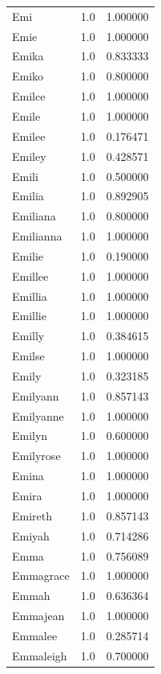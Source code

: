 \documentclass[
  letterpaper,
  DIV=11,
  numbers=noendperiod]{scrreprt}
\begin{document}
\begin{tabular}{lrr}
Emi             &   1.0 &   1.000000 \\
Emie            &   1.0 &   1.000000 \\
Emika           &   1.0 &   0.833333 \\
Emiko           &   1.0 &   0.800000 \\
Emilce          &   1.0 &   1.000000 \\
Emile           &   1.0 &   1.000000 \\
Emilee          &   1.0 &   0.176471 \\
Emiley          &   1.0 &   0.428571 \\
Emili           &   1.0 &   0.500000 \\
Emilia          &   1.0 &   0.892905 \\
Emiliana        &   1.0 &   0.800000 \\
Emilianna       &   1.0 &   1.000000 \\
Emilie          &   1.0 &   0.190000 \\
Emillee         &   1.0 &   1.000000 \\
Emillia         &   1.0 &   1.000000 \\
Emillie         &   1.0 &   1.000000 \\
Emilly          &   1.0 &   0.384615 \\
Emilse          &   1.0 &   1.000000 \\
Emily           &   1.0 &   0.323185 \\
Emilyann        &   1.0 &   0.857143 \\
Emilyanne       &   1.0 &   1.000000 \\
Emilyn          &   1.0 &   0.600000 \\
Emilyrose       &   1.0 &   1.000000 \\
Emina           &   1.0 &   1.000000 \\
Emira           &   1.0 &   1.000000 \\
Emireth         &   1.0 &   0.857143 \\
Emiyah          &   1.0 &   0.714286 \\
Emma            &   1.0 &   0.756089 \\
Emmagrace       &   1.0 &   1.000000 \\
Emmah           &   1.0 &   0.636364 \\
Emmajean        &   1.0 &   1.000000 \\
Emmalee         &   1.0 &   0.285714 \\
Emmaleigh       &   1.0 &   0.700000 \\

\end{tabular}
\end{document}
